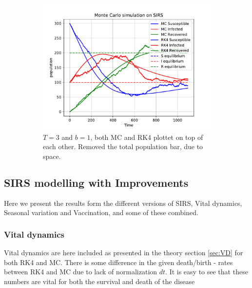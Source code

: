 \begin{figure}[H]
\begin{subfigure}{0.6\textwidth}
         \centering
         \includegraphics[width=\linewidth]{../fig/newfig/MCRK4_b1T3.pdf}
         \caption{$T = 3$ and $b =1$, both MC and RK4 plottet on top of each other. Removed the total population bar, due to space.}
    \end{subfigure}
    \caption{}
    \label{fig:MCSIRS}
\end{figure}

\subsection{SIRS modelling with Improvements}
Here we present the results form the different versions of SIRS, Vital dynamics, Seasonal variation and Vaccination, and some of these combined. 

\subsubsection{Vital dynamics}
Vital dynamics are here included as presented in the theory section \ref{sec:VD} for both RK4 and MC. There is some difference in the given death/birth - rates between RK4 and MC due to lack of normalization $dt$. It is easy to see that these numbers are vital for both the survival and death of the disease

